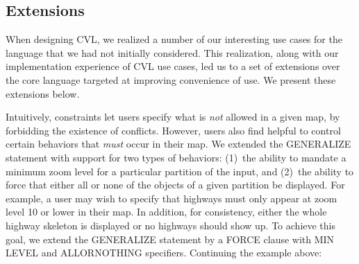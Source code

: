 \subsection{Extensions}
\label{sec:implementation:extensions}

When designing CVL, we realized a number of our interesting use cases for the language that we had not initially considered. This realization, along with our implementation experience of CVL use cases, led us to a set of extensions over the core language targeted at improving convenience of use. We present these extensions below.




Intuitively, constraints let users specify what is \emph{not} allowed in a given map, by forbidding the existence of conflicts. However, users also find helpful to control certain behaviors that \emph{must} occur in their map. We extended the GENERALIZE statement with support for two types of behaviors: (1)~the ability to mandate a minimum zoom level for a particular partition of the input, and (2)~the ability to force that either all or none of the objects of a given partition be displayed. For example, a user may wish to specify that highways must only appear at zoom level 10 or lower in their map. In addition, for consistency, either the whole highway skeleton is displayed or no highways should show up. To achieve this goal, we extend the GENERALIZE statement by a FORCE clause with MIN LEVEL and ALLORNOTHING specifiers. Continuing the example above:

